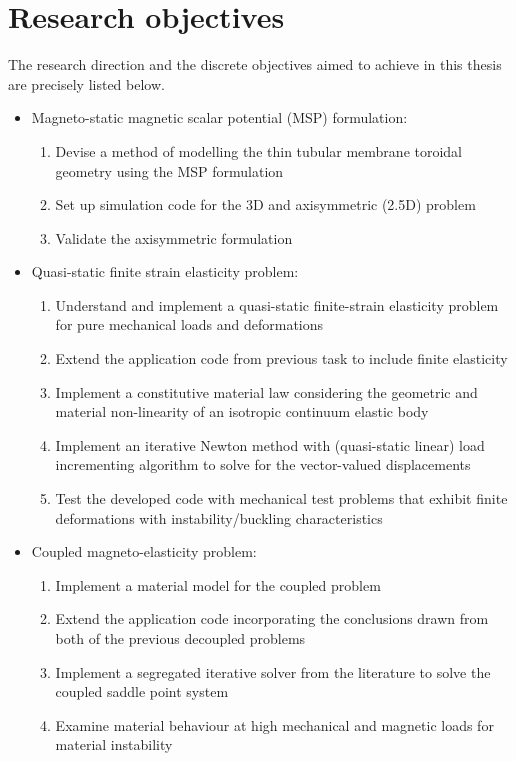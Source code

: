 \section{Research objectives}
The research direction and the discrete objectives aimed to achieve in this thesis are precisely listed below.
\begin{itemize}
\item Magneto-static magnetic scalar potential (MSP) formulation:
\begin{enumerate}
\item Devise a method of modelling the thin tubular membrane toroidal geometry using the MSP formulation 
\item Set up simulation code for the 3D and axisymmetric (2.5D) problem
\item Validate the axisymmetric formulation 
\end{enumerate}
\item Quasi-static finite strain elasticity problem:
\begin{enumerate}
\item Understand and implement a quasi-static finite-strain elasticity problem for pure mechanical loads and deformations \cite{Pelteret2016a, Pelteret2012}
\item Extend the application code from previous task to include finite elasticity
\item Implement a constitutive material law considering the geometric and material non-linearity of an isotropic continuum elastic body \cite{Wriggers2008}
\item Implement an iterative Newton method with (quasi-static linear) load incrementing algorithm to solve for the vector-valued displacements
\item Test the developed code with mechanical test problems that exhibit finite deformations with instability/buckling characteristics
\end{enumerate}
\item Coupled magneto-elasticity problem:
\begin{enumerate}
\item Implement a material model for the coupled problem \cite{pelteret2016, Saxena2015}
\item Extend the application code incorporating the conclusions drawn from both of the previous decoupled problems
\item Implement a segregated iterative solver from the literature \cite{Benzi2005} to solve the coupled saddle point system
\item Examine material behaviour at high mechanical and magnetic loads for material instability
\end{enumerate}
\end{itemize}


